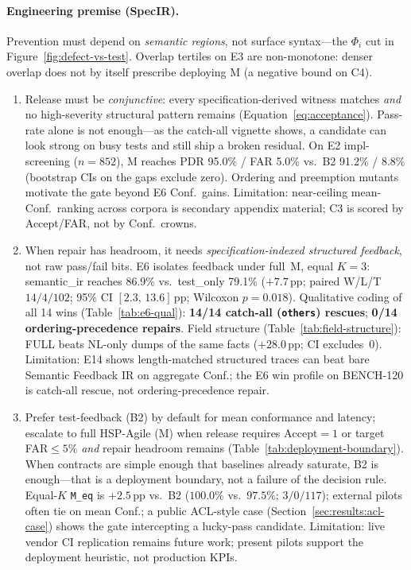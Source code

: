 \paragraph{Engineering premise (SpecIR).}
Prevention must depend on \emph{semantic regions}, not surface syntax---the
$\Phi_i$ cut in Figure~\ref{fig:defect-vs-test}.
Overlap tertiles on E3 are non-monotone: denser overlap does not by itself
prescribe deploying M (a negative bound on C4).

\begin{enumerate}
  \item[\textbf{C3.}]
    Release must be \emph{conjunctive}: every specification-derived witness
    matches \emph{and} no high-severity structural pattern remains
    (Equation~\eqref{eq:acceptance}).
    Pass-rate alone is not enough---as the catch-all vignette shows, a
    candidate can look strong on busy tests and still ship a broken residual.
    On E2 impl-screening ($n{=}852$), M reaches PDR 95.0\% / FAR 5.0\% vs.\
    B2 91.2\% / 8.8\% (bootstrap CIs on the gaps exclude zero).
    Ordering and preemption mutants motivate the gate beyond E6 Conf.\ gains.
    Limitation: near-ceiling mean-Conf.\ ranking across corpora is secondary
    appendix material; C3 is scored by Accept/FAR, not by Conf.\ crowns.

  \item[\textbf{C2.}]
    When repair has headroom, it needs \emph{specification-indexed structured
    feedback}, not raw pass/fail bits.
    E6 isolates feedback under full~M, equal $K{=}3$: semantic\_ir reaches
    86.9\% vs.\ test\_only 79.1\% (${+}7.7$\,pp; paired W/L/T $14/4/102$;
    95\% CI $[2.3,\,13.6]$\,pp; Wilcoxon $p{=}0.018$).
    Qualitative coding of all 14 wins (Table~\ref{tab:e6-qual}):
    \textbf{14/14 catch-all (\texttt{others}) rescues};
    \textbf{0/14 ordering-precedence repairs}.
    Field structure (Table~\ref{tab:field-structure}): FULL beats NL-only
    dumps of the same facts (${+}28.0$\,pp; CI excludes~0).
    Limitation: E14 shows length-matched structured traces can beat bare
    Semantic Feedback IR on aggregate Conf.; the E6 win profile on BENCH-120
    is catch-all rescue, not ordering-precedence repair.

  \item[\textbf{C4.}]
    Prefer test-feedback (B2) by default for mean conformance and latency;
    escalate to full HSP-Agile (M) when release requires
    $\mathrm{Accept}{=}1$ or target FAR${\le}5\%$ \emph{and} repair headroom
    remains (Table~\ref{tab:deployment-boundary}).
    When contracts are simple enough that baselines already saturate, B2 is
    enough---that is a deployment boundary, not a failure of the decision
    rule.
    Equal-$K$ \texttt{M\_eq} is ${+}2.5$\,pp vs.\ B2 ($100.0\%$ vs.\ $97.5\%$;
    $3/0/117$); external pilots often tie on mean Conf.; a public ACL-style
    case (Section~\ref{sec:results:acl-case}) shows the gate intercepting a
    lucky-pass candidate.
    Limitation: live vendor CI replication remains future work; present
    pilots support the deployment heuristic, not production KPIs.
\end{enumerate}

